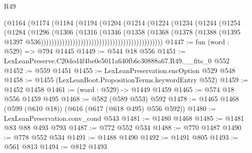 \begin{lexlean}{R49}
\begin{coremodule}
                                                        (@1164
                                                          (@1174
                                                            (@1184
                                                              (@1194
                                                                (@1204
                                                                  (@1214
                                                                    (@1224
                                                                      (@1234
                                                                        (@1244
                                                                          (@1254
                                                                            (@1284
                                                                              (@1296
                                                                                (@1306
                                                                                  (@1316
                                                                                    (@1346
                                                                                      (@1358
                                                                                        (@1368
                                                                                          (@1378
                                                                                            (@1388
                                                                                              (@1395
                                                                                                @1397
                                                                                                @536))))))))))))))))))))))))))))))))))))))))))))))
@1447 := fun (word : @529) => @794 @1445
@1449 := @544 @18 @556
@1451 := LexLeanPreserve.C20ded4f4be0e5011a640fb6c30888a67.R49.__fits_0 @552
@1452 := @559 @1451
@1455 := LexLeanPreservation.encOption @529 @548
@1458 := @1455 (LexLeanBoot.PropositionTerms.keywordEntry @552)
@1459 := @1452 @1458
@1461 := (word : @529) -> @1449 @1459
@1465 := @574 @18 @556 @1459 @495
@1468 := @582 (@589 @553) @592
@1478 := @1465 @1468 (@599 (@610 @18)) (@616 (@617 (@618 @495) @556 @592))
@1480 := LexLeanPreservation.conv_cond @543
@1481 := @1480 @1468
@1485 := @1481 @83 @88 @493 @793
@1487 := @772 @552 @534
@1488 := @770 @1487
@1490 := @778 @552 @534
@1491 := @1488 @1490
@1492 := @1491 @805
@1493 := @561 @813
@1494 := @812 @1493

\end{coremodule}
\end{lexlean}
